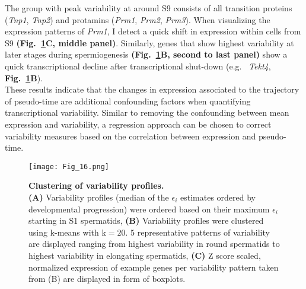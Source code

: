 The group with peak variability at around S9 consists of all transition proteins (\textit{Tnp1}, \textit{Tnp2}) and protamins (\textit{Prm1}, \textit{Prm2}, \textit{Prm3}). When visualizing the expression patterns of \textit{Prm1}, I detect a quick shift in expression within cells from S9 \textbf{(Fig.~\ref{fig3:variability_clustering}C, middle panel)}. Similarly, genes that show highest variability at later stages during spermiogenesis \textbf{(Fig.~\ref{fig3:variability_clustering}B, second to last panel)} show a quick transcriptional decline after transcriptional shut-down (e.g.~ \emph{Tekt4}, \textbf{Fig.~\ref{fig3:variability_clustering}B}). \\

These results indicate that the changes in expression associated to the trajectory of pseudo-time are additional confounding factors when quantifying transcriptional variability. Similar to removing the confounding between mean expression and variability, a regression approach can be chosen to correct variability measures based on the correlation between expression and pseudo-time. 



\newpage

\begin{figure}[!h]
\centering
\texttt{[image: Fig\_16.png]}
\caption[Clustering of variability profiles]{\textbf{Clustering of variability profiles.}\\
\textbf{(A)} Variability profiles (median of the $\epsilon_i$ estimates ordered by developmental progression) were ordered based on their maximum $\epsilon_i$ starting in S1 spermatids, \textbf{(B)} Variability profiles were clustered using k-means with $\text{k}=20$. 5 representative patterns of variability are displayed ranging from highest variability in round spermatids to highest variability in elongating spermatids, \textbf{(C)} Z score scaled, normalized expression of example genes per variability pattern taken from (B) are displayed in form of boxplots.}
\label{fig3:variability_clustering}
\end{figure}

